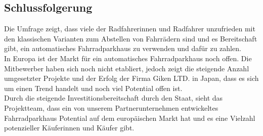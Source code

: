 \subsection{Schlussfolgerung}

Die Umfrage zeigt, dass viele der Radfahrerinnen und Radfahrer unzufrieden mit den klassischen Varianten zum Abstellen von Fahrrädern sind und es Bereitschaft gibt, ein automatisches Fahrradparkhaus zu verwenden und dafür zu zahlen.\\
In Europa ist der Markt für ein automatisches Fahrradparkhaus noch offen. Die Mitbewerber haben sich noch nicht etabliert, jedoch zeigt die steigende Anzahl umgesetzter Projekte und der Erfolg der Firma Giken LTD. in Japan, dass es sich um einen Trend handelt und noch viel Potential offen ist.\\
Durch die steigende Investitionsbereitschaft durch den Staat, sieht das Projektteam, dass ein von unserem Partnerunternehmen entwickeltes Fahrradparkhaus Potential auf dem europäischen Markt hat und es eine Vielzahl potenzieller Käuferinnen und Käufer gibt.\\
